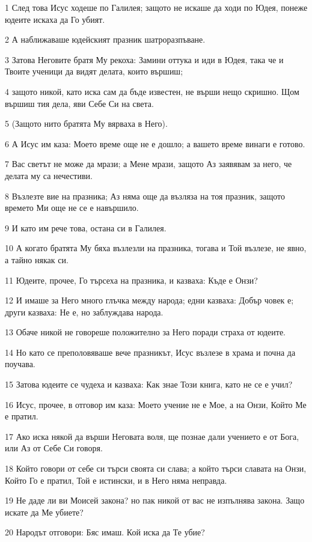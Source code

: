 \par 1 След това Исус ходеше по Галилея; защото не искаше да ходи по Юдея, понеже юдеите искаха да Го убият.
\par 2 А наближаваше юдейският празник шатроразпъване.
\par 3 Затова Неговите братя Му рекоха: Замини оттука и иди в Юдея, така че и Твоите ученици да видят делата, които вършиш;
\par 4 защото никой, като иска сам да бъде известен, не върши нещо скришно. Щом вършиш тия дела, яви Себе Си на света.
\par 5 (Защото нито братята Му вярваха в Него).
\par 6 А Исус им каза: Моето време още не е дошло; а вашето време винаги е готово.
\par 7 Вас светът не може да мрази; а Мене мрази, защото Аз заявявам за него, че делата му са нечестиви.
\par 8 Възлезте вие на празника; Аз няма още да възляза на тоя празник, защото времето Ми още не се е навършило.
\par 9 И като им рече това, остана си в Галилея.
\par 10 А когато братята Му бяха възлезли на празника, тогава и Той възлезе, не явно, а тайно някак си.
\par 11 Юдеите, прочее, Го търсеха на празника, и казваха: Къде е Онзи?
\par 12 И имаше за Него много глъчка между народа; едни казваха: Добър човек е; други казваха: Не е, но заблуждава народа.
\par 13 Обаче никой не говореше положително за Него поради страха от юдеите.
\par 14 Но като се преполовяваше вече празникът, Исус възлезе в храма и почна да поучава.
\par 15 Затова юдеите се чудеха и казваха: Как знае Този книга, като не се е учил?
\par 16 Исус, прочее, в отговор им каза: Моето учение не е Мое, а на Онзи, Който Ме е пратил.
\par 17 Ако иска някой да върши Неговата воля, ще познае дали учението е от Бога, или Аз от Себе Си говоря.
\par 18 Който говори от себе си търси своята си слава; а който търси славата на Онзи, Който Го е пратил, Той е истински, и в Него няма неправда.
\par 19 Не даде ли ви Моисей закона? но пак никой от вас не изпълнява закона. Защо искате да Ме убиете?
\par 20 Народът отговори: Бяс имаш. Кой иска да Те убие?
